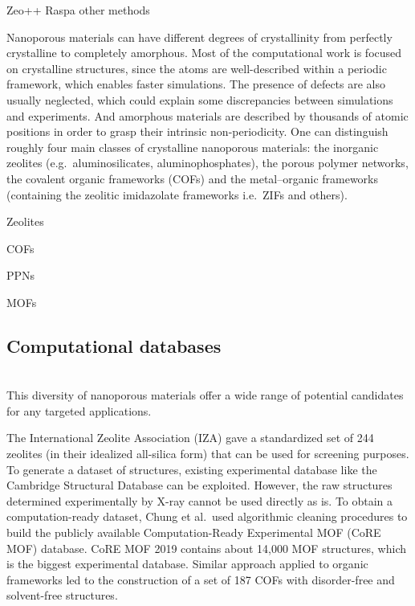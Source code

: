 \documentclass[main.tex]{subfiles}
\begin{document}
Zeo++ Raspa  other methods 


Nanoporous materials can have different degrees of crystallinity from perfectly crystalline to completely amorphous. Most of the computational work is focused on crystalline structures, since the atoms are well-described within a periodic framework, which enables faster simulations. The presence of defects are also usually neglected, which could explain some discrepancies between simulations and experiments. And amorphous materials are described by thousands of atomic positions in order to grasp their intrinsic non-periodicity.\cite{Thyagarajan_2020} One can distinguish roughly four main classes of crystalline nanoporous materials: the inorganic zeolites (e.g.\ aluminosilicates, aluminophosphates), the porous polymer networks, the covalent organic frameworks (COFs) and the metal--organic frameworks (containing the zeolitic imidazolate frameworks i.e.\ ZIFs and others).

Zeolites

COFs

PPNs

MOFs

\subsection{Computational databases}

 \\

This diversity of nanoporous materials offer a wide range of potential candidates for any targeted applications.

The International Zeolite Association (IZA) gave a standardized set of 244 zeolites (in their idealized all-silica form) that can be used for screening purposes. To generate a dataset of structures, existing experimental database like the Cambridge Structural Database can be exploited. However, the raw structures determined experimentally by X-ray cannot be used directly as is. To obtain a computation-ready dataset, Chung et al.\ used algorithmic cleaning procedures to build the publicly available Computation-Ready Experimental MOF (CoRE MOF) database.\cite{Chung_2014, Chung_2019} CoRE MOF 2019 contains about 14,000 MOF structures, which is the biggest experimental database. Similar approach applied to organic frameworks led to the construction of a set of 187 COFs with disorder-free and solvent-free structures.\cite{Tong_2017,Ongari_2019}
\end{document}
